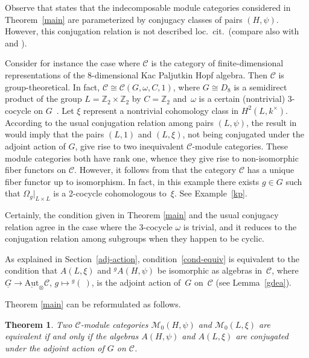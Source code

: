 \documentclass[11pt]{article}
\numberwithin{equation}{section}
\newtheorem{Theorem}{Theorem}[section]
\newcommand{\cch}{\Omega}
\newcommand{\C}{{\mathcal C}}
\newcommand{\M}{{\mathcal M}}
\newcommand{\1}{\textbf{1}}
\begin{document}
Observe that \cite[Theorem 3.1]{ostrik} states that the indecomposable module categories considered in Theorem~\ref{main} are parameterized by conjugacy classes of pairs $(H, \psi)$. However, this conjugation relation is not described loc.\ cit.\ (compare also with \cite{nikshych} and \cite[Section~9.7]{egno}).

 Consider for instance the case where $\C$ is the category of f\/inite-dimensional representations of the 8-dimensional Kac Paljutkin Hopf algebra. Then $\C$ is group-theoretical. In fact, $\C \cong \C(G, \omega, C, 1)$, where $G \cong D_8$ is a semidirect product of the group $L = \mathbb Z_2 \times \mathbb Z_2$ by $C = \mathbb Z_2$ and~$\omega$ is a certain (nontrivial) 3-cocycle on $G$~\cite{schauenburg}. Let $\xi$ represent a nontrivial cohomology class in $H^2(L, k^\times)$. According to the usual conjugation relation among pairs $(L, \psi)$, the result in \cite[Theorem~3.1]{ostrik} would imply that the pairs $(L, 1)$ and $(L, \xi)$, not being conjugated under the adjoint action of $G$, give rise to two inequivalent $\C$-module categories. These module categories both have rank one, whence they give rise to non-isomorphic f\/iber functors on $\C$. However, it follows from \cite[Theorem~4.8(1)]{ma-contemp} that the category $\C$ has a unique f\/iber functor up to isomorphism. In fact, in this example there exists $g \in G$ such that $\cch_g\vert_{L\times L}$ is a 2-cocycle cohomologous to~$\xi$. See Example~\ref{kp}.

Certainly, the condition given in Theorem \ref{main} and the usual conjugacy relation agree in the case where the 3-cocycle $\omega$ is trivial, and it reduces to the conjugation relation among subgroups when they happen to be cyclic.

As explained in Section~\ref{adj-action}, condition~\eqref{cond-equiv} is equivalent to the condition that $A(L, \xi)$ and ${}^gA(H, \psi)$ be isomorphic as algebras in~$\C$, where $\underline{G} \to \underline{\text{Aut}}_\otimes\C$, $g \mapsto {}^g( \ )$, is the adjoint action of~$G$ on~$\C$ (see Lemma~\ref{gdea}).

Theorem \ref{main} can be reformulated as follows.

\begin{Theorem} Two $\C$-module categories $\M_0(H, \psi)$ and $\M_0(L, \xi)$ are equivalent if and only if the algebras $A(H, \psi)$ and $A(L, \xi)$ are conjugated under the adjoint action of $G$ on $\C$.
\end{Theorem}
\end{document}
